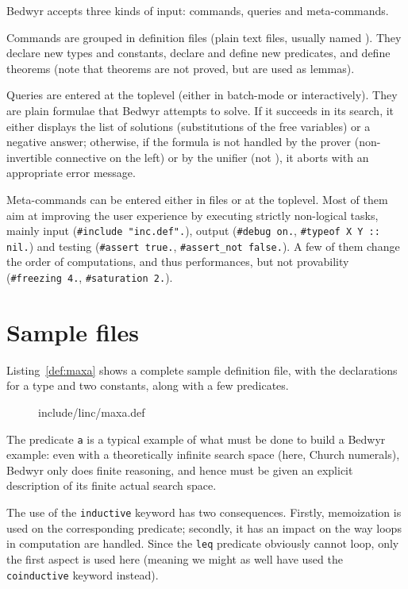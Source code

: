 \documentclass[a4paper]{article} %
\begin{document}
Bedwyr accepts three kinds of input: commands, queries and meta-commands.

Commands are grouped in definition files (plain text files,
usually named ).  They declare new types and constants,
declare and define new predicates, and define theorems
(note that theorems are not proved, but are used as lemmas).

Queries are entered at the toplevel (either in batch-mode or interactively).
They are plain formulae that Bedwyr attempts to solve.
If it succeeds in its search, it either displays the list of solutions
(substitutions of the free variables) or a negative answer; otherwise,
if the formula is not handled by the prover (non-invertible connective on the
left) or by the unifier (not \Ll{}), it aborts with an appropriate error
message.

Meta-commands can be entered either in files or at the toplevel.
Most of them aim at improving the user experience by executing strictly
non-logical tasks, mainly input (\lstinline+#include "inc.def".+), output
(\lstinline+#debug on.+, \lstinline+#typeof X Y :: nil.+) and testing
(\lstinline+#assert true.+, \lstinline+#assert_not false.+).
A few of them change the order of computations, and thus performances, but not
provability (\lstinline+#freezing 4.+, \lstinline+#saturation 2.+).

\section{Sample files}

Listing~\ref{def:maxa} shows a complete sample definition file,
with the declarations for a type and two constants, along with a few predicates.

\begin{figure}

  {include/linc/maxa.def}
\end{figure}

The predicate \lstinline+a+ is a typical example of what must be done to build
a Bedwyr example: even with a theoretically infinite search space
(here, Church numerals), Bedwyr only does finite reasoning, and hence must be
given an explicit description of its finite actual search space.

The use of the \lstinline+inductive+ keyword has two consequences.
Firstly, memoization is used on the corresponding predicate;
secondly, it has an impact on the way loops in computation are handled.
Since the \lstinline+leq+ predicate obviously cannot loop,
only the first aspect is used here (meaning we might as well have used the
\lstinline+coinductive+ keyword instead).
\end{document}
